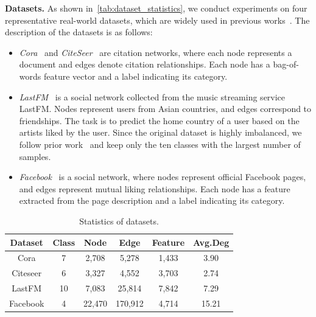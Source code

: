 \documentclass[conference,compsoc]{IEEEtran}
\theoremstyle{boldplain}
\theoremstyle{bolddefinition}
\theoremstyle{remark}
\newcommand{\mypara}[1]{\noindent\textbf{#1.}\xspace}
\begin{document}
\mypara{Datasets}
As shown in~\autoref{tab:dataset_statistics}, we conduct experiments on four representative real-world datasets,
which are widely used in previous works~\cite{upgnet-cite,lpgNN}.
The description of the datasets is as follows:
\begin{itemize}
    \item \textit{Cora}~\cite{yang2016planetoid} and \textit{CiteSeer}~\cite{yang2016planetoid} are citation networks, where each node represents a document and edges denote citation relationships. 
    Each node has a bag-of-words feature vector and a label indicating its category.
    \item \textit{LastFM}~\cite{rozemberczki2020characteristic} is a social network collected from the music streaming service LastFM. 
    Nodes represent users from Asian countries, and edges correspond to friendships. 
    The task is to predict the home country of a user based on the artists liked by the user. 
    Since the original dataset is highly imbalanced, we follow prior work~\cite{lpgNN} and keep only the ten classes with the largest number of samples.
    \item \textit{Facebook}~\cite{rozemberczki2021musae} is a social network, where nodes represent official Facebook pages, and edges represent mutual liking relationships. 
    Each node has a feature extracted from the page description and a label indicating its category.
\end{itemize}



\begin{table}[t]
    \centering
    \caption{Statistics of datasets.}
    \label{tab:dataset_statistics}
    \small
    \begin{tabular}{cccccc}
        \toprule
        Dataset & Class & Node & Edge & Feature & Avg.Deg \\
        \midrule
        Cora& 7  & 2,708  & 5,278   & 1,433 & 3.90  \\
        Citeseer& 6  & 3,327  & 4,552   & 3,703 & 2.74  \\
        LastFM& 10 & 7,083  & 25,814  & 7,842 & 7.29  \\
        Facebook& 4  & 22,470 & 170,912 & 4,714 & 15.21 \\
        \bottomrule
    \end{tabular}
    \vspace{0.5ex}
\end{table}
\end{document}
